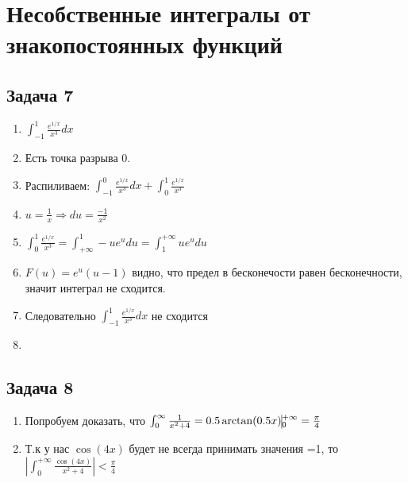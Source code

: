 \documentclass[a4paper,12pt]{article}
\begin{document}
\section{Несобственные интегралы от знакопостоянных функций}

\subsection{Задача 7}
\begin{enumerate}
    \item $\int_{-1}^{1} \frac{e^{1/x}}{x^3}dx $
    \item Есть точка разрыва 0.
    \item Распиливаем: $\int_{-1}^{0} \frac{e^{1/x}}{x^3}dx  + \int_{0}^{1} \frac{e^{1/x}}{x^3}$
    \item $u = \frac{1}{x} \Rightarrow du = \frac{-1}{x^2}$
    \item $\int_{0}^{1} \frac{e^{1/x}}{x^3} = \int_{+\infty}^{1} -ue^udu = \int_{1}^{+\infty} ue^udu$
    \item $F(u) = e^u(u-1)$ видно, что предел в бесконечости равен бесконечности, значит интеграл не сходится.
    \item Следовательно $\int_{-1}^{1} \frac{e^{1/x}}{x^3}dx $ не сходится
    \item 
\end{enumerate}

\subsection{Задача 8}
\begin{enumerate}
    \item Попробуем доказать, что $\int_{0}^{\infty}\frac{1}{x^2+4} = 0.5\arctan(0.5x)\vline_{0}^{+\infty} = \frac{\pi}{4}$
    \item Т.к у нас $\cos(4x)$ будет не всегда принимать значения =1, то $|\int_{0}^{+\infty}\frac{\cos(4x)}{x^2+4}|<\frac{\pi}{4}$
\end{enumerate}
\end{document}
